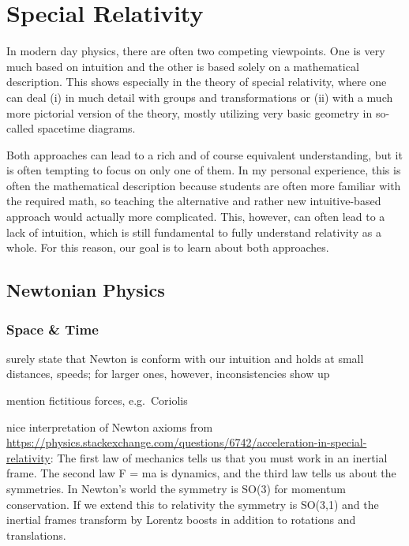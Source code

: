 





\chapter{Special Relativity}

\begin{center}
In modern day physics, there are often two competing viewpoints. One is very much based on intuition and the other is based solely on a mathematical description. This shows especially in the theory of special relativity, where one can deal (i) in much detail with groups and transformations or (ii) with a much more pictorial version of the theory, mostly utilizing very basic geometry in so-called spacetime diagrams.

Both approaches can lead to a rich and of course equivalent understanding, but it is often tempting to focus on only one of them. In my personal experience, this is often the mathematical description because students are often more familiar with the required math, so teaching the alternative and rather new intuitive-based approach would actually more complicated. This, however, can often lead to a lack of intuition, which is still fundamental to fully understand relativity as a whole. For this reason, our goal is to learn about both approaches.
\end{center}





\newpage



	\section{Newtonian Physics}
		\subsection{Space \& Time}

surely state that Newton is conform with our intuition and holds at small distances, speeds; for larger ones, however, inconsistencies show up

mention fictitious forces, e.g.~Coriolis


nice interpretation of Newton axioms from \url{https://physics.stackexchange.com/questions/6742/acceleration-in-special-relativity}: The first law of mechanics tells us that you must work in an inertial frame. The second law F = ma is dynamics, and the third law tells us about the symmetries. In Newton’s world the symmetry is SO(3) for momentum conservation. If we extend this to relativity the symmetry is SO(3,1) and the inertial frames transform by Lorentz boosts in addition to rotations and translations.



